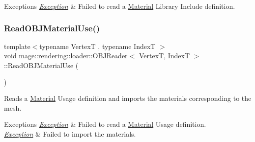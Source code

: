 \begin{DoxyExceptions}{Exceptions}
{\em \hyperlink{classmage_1_1_exception}{Exception}} & Failed to read a \hyperlink{classmage_1_1rendering_1_1_material}{Material} Library Include definition. \\
\hline
\end{DoxyExceptions}
\hypertarget{classmage_1_1rendering_1_1loader_1_1_o_b_j_reader_a5aa719224a08175bcbcb26873e2fb5e1}{}\label{classmage_1_1rendering_1_1loader_1_1_o_b_j_reader_a5aa719224a08175bcbcb26873e2fb5e1} 
\subsubsection{\texorpdfstring{Read\+O\+B\+J\+Material\+Use()}{ReadOBJMaterialUse()}}
{\footnotesize\ttfamily template$<$typename VertexT , typename IndexT $>$ \\
void \hyperlink{classmage_1_1rendering_1_1loader_1_1_o_b_j_reader}{mage\+::rendering\+::loader\+::\+O\+B\+J\+Reader}$<$ VertexT, IndexT $>$\+::Read\+O\+B\+J\+Material\+Use (\begin{DoxyParamCaption}{ }\end{DoxyParamCaption})\hspace{0.3cm}{\ttfamily [private]}}

Reads a \hyperlink{classmage_1_1rendering_1_1_material}{Material} Usage definition and imports the materials corresponding to the mesh.


\begin{DoxyExceptions}{Exceptions}
{\em \hyperlink{classmage_1_1_exception}{Exception}} & Failed to read a \hyperlink{classmage_1_1rendering_1_1_material}{Material} Usage definition. \\
\hline
{\em \hyperlink{classmage_1_1_exception}{Exception}} & Failed to import the materials. \\
\hline
\end{DoxyExceptions}
\hypertarget{classmage_1_1rendering_1_1loader_1_1_o_b_j_reader_a519f333ce13777d469c63eae7ab8dcf4}{}\label{classmage_1_1rendering_1_1loader_1_1_o_b_j_reader_a519f333ce13777d469c63eae7ab8dcf4} 
